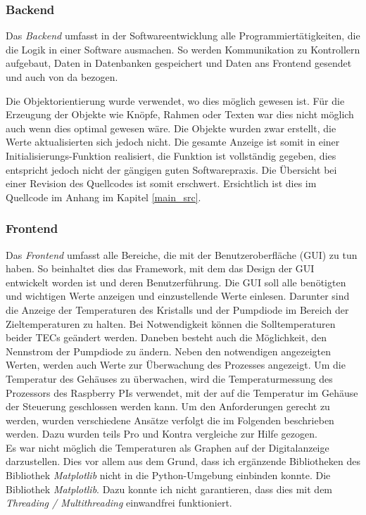 \subsubsection{Backend}
Das \textit{Backend} umfasst in der Softwareentwicklung alle Programmiertätigkeiten, die die Logik in einer Software ausmachen. So werden Kommunikation zu Kontrollern aufgebaut, Daten in Datenbanken gespeichert und Daten ans Frontend gesendet und auch von da bezogen.

Die Objektorientierung wurde verwendet, wo dies möglich gewesen ist. Für die Erzeugung der Objekte wie Knöpfe, Rahmen oder Texten war dies nicht möglich auch wenn dies optimal gewesen wäre. Die Objekte wurden zwar erstellt, die Werte aktualisierten sich jedoch nicht. Die gesamte Anzeige ist somit in einer Initialisierungs-Funktion realisiert, die Funktion ist vollständig gegeben, dies entspricht jedoch nicht der gängigen guten Softwarepraxis. Die Übersicht bei einer Revision des Quellcodes ist somit erschwert. Ersichtlich ist dies im Quellcode im Anhang im Kapitel \ref{main_src}. 

\subsubsection{Frontend}
Das \textit{Frontend} umfasst alle Bereiche, die mit der Benutzeroberfläche (GUI) zu tun haben. So beinhaltet dies das Framework, mit dem das Design der GUI entwickelt worden ist und deren Benutzerführung. 
Die GUI soll alle benötigten und wichtigen Werte anzeigen und einzustellende Werte einlesen. Darunter sind die Anzeige der Temperaturen des Kristalls und der Pumpdiode im Bereich der Zieltemperaturen zu halten. Bei Notwendigkeit können die Solltemperaturen beider TECs geändert werden. Daneben besteht auch die Möglichkeit, den Nennstrom der Pumpdiode zu ändern. Neben den notwendigen angezeigten Werten, werden auch Werte zur Überwachung des Prozesses angezeigt. Um die Temperatur des Gehäuses zu überwachen, wird die Temperaturmessung des Prozessors des Raspberry PIs verwendet, mit der auf die Temperatur im Gehäuse der Steuerung geschlossen werden kann. Um den Anforderungen gerecht zu werden, wurden verschiedene Ansätze verfolgt die im Folgenden beschrieben werden. Dazu wurden teils Pro und Kontra vergleiche zur Hilfe gezogen.\\

Es war nicht möglich die Temperaturen als Graphen auf der Digitalanzeige darzustellen. Dies vor allem aus dem Grund, dass ich ergänzende Bibliotheken des Bibliothek \textit{Matplotlib} nicht in die Python-Umgebung einbinden konnte. Die Bibliothek \textit{Matplotlib}. Dazu konnte ich nicht garantieren, dass dies mit dem \textit{Threading / Multithreading} einwandfrei funktioniert.

